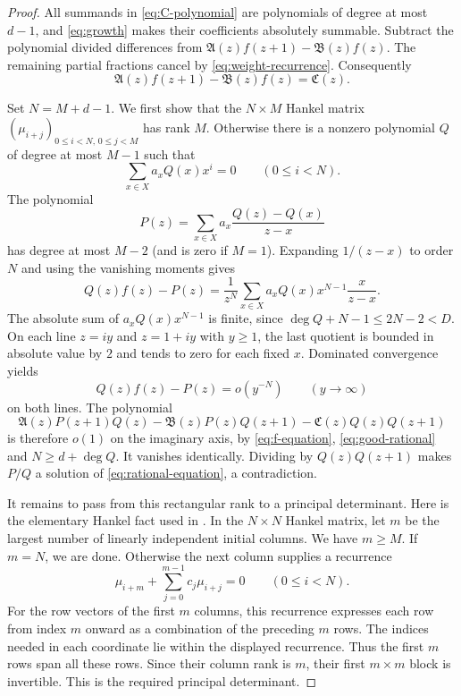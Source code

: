 \documentclass[11pt]{article}
\theoremstyle{remark}
\numberwithin{equation}{section}
\begin{document}
\begin{proof}
All summands in \eqref{eq:C-polynomial} are polynomials of degree at most
$d-1$, and \eqref{eq:growth} makes their coefficients absolutely summable.
Subtract the polynomial divided differences from
$\mathfrak A(z)f(z+1)-\mathfrak B(z)f(z)$. The remaining partial fractions
cancel by \eqref{eq:weight-recurrence}. Consequently
\begin{equation}\label{eq:f-equation}
 \mathfrak A(z)f(z+1)-\mathfrak B(z)f(z)=\mathfrak C(z).
\end{equation}

Set $N=M+d-1$. We first show that the $N\times M$ Hankel matrix
$(\mu_{i+j})_{0\leq i<N,\,0\leq j<M}$ has rank $M$. Otherwise there
is a nonzero polynomial $Q$ of degree at most $M-1$ such that
\[
 \sum_{x\in X}a_x Q(x)x^i=0\qquad(0\leq i<N).
\]
The polynomial
\[
 P(z)=\sum_{x\in X}a_x\frac{Q(z)-Q(x)}{z-x}
\]
has degree at most $M-2$ (and is zero if $M=1$). Expanding $1/(z-x)$
to order $N$ and using the vanishing moments gives
\[
 Q(z)f(z)-P(z)=\frac1{z^N}\sum_{x\in X}
                     a_x Q(x)x^{N-1}\frac{x}{z-x}.
\]
The absolute sum of $a_xQ(x)x^{N-1}$ is finite, since
$\deg Q+N-1\leq2N-2<D$. On each line $z=iy$ and $z=1+iy$ with
$y\geq1$, the last quotient is bounded in absolute value by $2$ and
tends to zero for each fixed $x$. Dominated convergence yields
\begin{equation}\label{eq:good-rational}
 Q(z)f(z)-P(z)=o(y^{-N})\qquad(y\to\infty)
\end{equation}
on both lines. The polynomial
\[
 \mathfrak A(z)P(z+1)Q(z)-\mathfrak B(z)P(z)Q(z+1)
       -\mathfrak C(z)Q(z)Q(z+1)
\]
is therefore $o(1)$ on the imaginary axis, by \eqref{eq:f-equation},
\eqref{eq:good-rational} and $N\geq d+\deg Q$. It vanishes identically.
Dividing by $Q(z)Q(z+1)$ makes $P/Q$ a solution of
\eqref{eq:rational-equation}, a contradiction.

It remains to pass from this rectangular rank to a principal determinant.
Here is the elementary Hankel fact used in \cite[Lemma~5.3]{FLSZ}. In
the $N\times N$ Hankel matrix, let $m$ be the largest number of linearly
independent initial columns. We have $m\geq M$. If $m=N$, we are done.
Otherwise the next column supplies a recurrence
\[
 \mu_{i+m}+\sum_{j=0}^{m-1}c_j\mu_{i+j}=0\qquad(0\leq i<N).
\]
For the row vectors of the first $m$ columns, this recurrence expresses
each row from index $m$ onward as a combination of the preceding $m$
rows. The indices needed in each coordinate lie within the displayed
recurrence. Thus the first $m$ rows span all these rows. Since their
column rank is $m$, their first $m\times m$ block is invertible. This
is the required principal determinant.
\end{proof}
\end{document}
